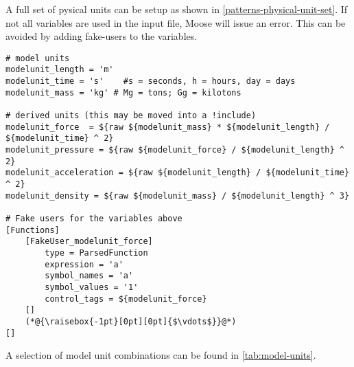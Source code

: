 A full set of pysical units can be setup as shown in
\autoref{patterns-physical-unit-set}. If not all variables are used in the
input file, Moose will issue an error. This can be avoided by adding fake-users
to the variables.

\begin{lstlisting}[language=Moose, caption={Set of consistent physical units in a Moose input file},label={patterns-physical-unit-set}]
# model units
modelunit_length = 'm'
modelunit_time = 's'    #s = seconds, h = hours, day = days
modelunit_mass = 'kg' # Mg = tons; Gg = kilotons

# derived units (this may be moved into a !include)
modelunit_force  = ${raw ${modelunit_mass} * ${modelunit_length} / ${modelunit_time} ^ 2}
modelunit_pressure = ${raw ${modelunit_force} / ${modelunit_length} ^ 2}
modelunit_acceleration = ${raw ${modelunit_length} / ${modelunit_time} ^ 2}
modelunit_density = ${raw ${modelunit_mass} / ${modelunit_length} ^ 3}

# Fake users for the variables above
[Functions]
    [FakeUser_modelunit_force]
        type = ParsedFunction
        expression = 'a'
        symbol_names = 'a'
        symbol_values = '1'
        control_tags = ${modelunit_force}
    []
    (*@{\raisebox{-1pt}[0pt][0pt]{$\vdots$}}@*)
[]
\end{lstlisting}

A selection of model unit combinations can be found in
\autoref{tab:model-units}.

